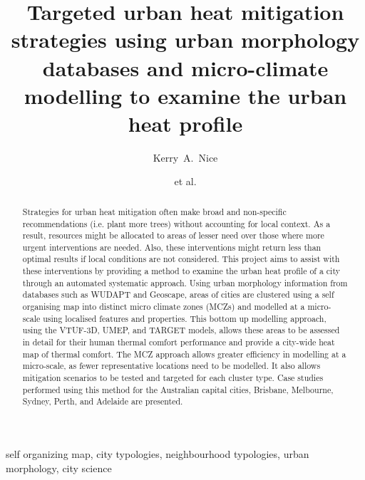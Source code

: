 \documentclass[final,3p,times,authoryear]{elsarticle}
\begin{document}

\title{Targeted urban heat mitigation strategies using urban morphology databases and micro-climate modelling to examine the urban heat profile}

\author[melb]{Kerry~A.~Nice}
\author[melb]{et al.}
\address[melb]{Transport, Health, and Urban Design Hub, Faculty of Architecture, Building, and Planning, University of Melbourne, Australia.}







\begin{abstract}
Strategies for urban heat mitigation often make broad and non-specific recommendations (i.e. plant more trees) without accounting for local context. As a result, resources might be allocated to areas of lesser need over those where more urgent interventions are needed. Also, these interventions might return less than optimal results if local conditions are not considered. This project aims to assist with these interventions by providing a method to examine the urban heat profile of a city through an automated systematic approach. Using urban morphology information from databases such as WUDAPT and Geoscape, areas of cities are clustered using a self organising map into distinct micro climate zones (MCZs) and modelled at a micro-scale using localised features and properties. This bottom up modelling approach, using the VTUF-3D, UMEP, and TARGET models, allows these areas to be assessed in detail for their human thermal comfort performance and provide a city-wide heat map of thermal comfort. The MCZ approach allows greater efficiency in modelling at a micro-scale, as fewer representative locations need to be modelled. It also allows mitigation scenarios to be tested and targeted for each cluster type. Case studies performed using this method for the Australian capital cities, Brisbane, Melbourne, Sydney, Perth, and Adelaide are presented.
\end{abstract}

\begin{keyword}
self organizing map\sep 
city typologies\sep
neighbourhood typologies\sep
urban morphology\sep
city science
\end{keyword}
\end{document}
